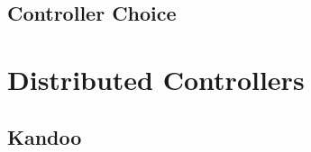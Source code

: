 \subsection{Controller Choice}
\label{sec:related:controller-choice}

\glsresetall
\section{Distributed Controllers}
\label{sec:related:distr-contr}

\subsection{Kandoo}
\label{sec:related:kandoo}

